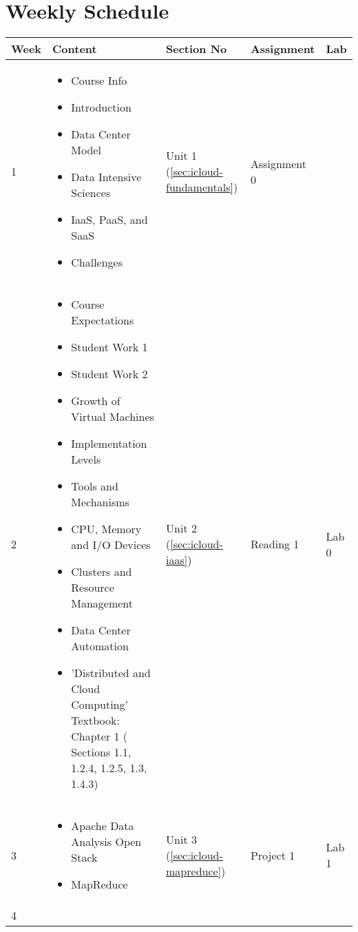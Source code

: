 \section{Weekly Schedule}
\begin{center}
  \begin{longtable}{|l|p{7cm}|p{1.5cm}|p{1.5cm}|p{1.5cm}|}
    \hline
    Week & Content & Section No & Assignment & Lab \\
    \hline
     1 & \begin{itemize}[leftmargin=*]
      \item Course Info 
      \item Introduction
      \item Data Center Model
      \item Data Intensive Sciences
      \item IaaS, PaaS, and SaaS
      \item Challenges
    \end{itemize}
    & Unit 1 (\ref{sec:icloud-fundamentals}) & Assignment 0 & ~ \\
    \hline
     2 & \begin{itemize}[leftmargin=*]
      \item Course Expectations
      \item Student Work 1
      \item Student Work 2
      \item Growth of Virtual Machines
      \item Implementation Levels
      \item Tools and Mechanisms
      \item CPU, Memory and I/O Devices
      \item Clusters and Resource Management
      \item Data Center Automation
      \item 'Distributed and Cloud Computing' Textbook: Chapter 1 ( Sections 1.1, 1.2.4, 1.2.5, 1.3, 1.4.3)
    \end{itemize}
    & Unit 2 (\ref{sec:icloud-iaas}) &	Reading 1 &	Lab 0 \\
    \hline
     3 &
    \begin{itemize}[leftmargin=*]
      \item Apache Data Analysis Open Stack
      \item MapReduce
    \end{itemize}
    & Unit 3 (\ref{sec:icloud-mapreduce}) & Project 1 &	Lab 1 \\
    \hline
     4 &

\end{longtable}
\end{center}
